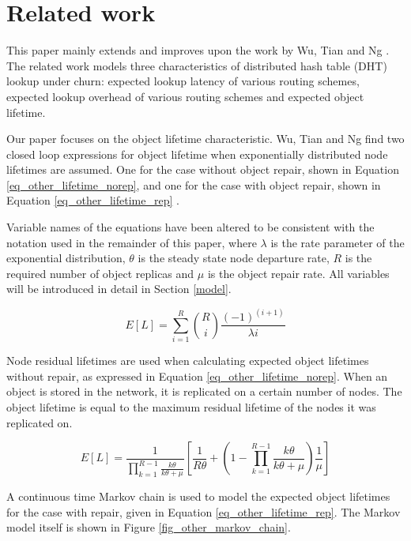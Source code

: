 \documentclass[10pt,a4paper,conference]{IEEEtran}
\begin{document}
\section{Related work}
\label{related_work}

This paper mainly extends and improves upon the work by Wu, Tian and Ng \cite{replication_article}. The related work models three characteristics of distributed hash table (DHT) lookup under churn: expected lookup latency of various routing schemes, expected lookup overhead of various routing schemes and expected object lifetime.

Our paper focuses on the object lifetime characteristic. Wu, Tian and Ng find two closed loop expressions for object lifetime when exponentially distributed node lifetimes are assumed. One for the case without object repair, shown in Equation \eqref{eq_other_lifetime_norep}, and one for the case with object repair, shown in Equation \eqref{eq_other_lifetime_rep} \cite{replication_article}.

Variable names of the equations have been altered to be consistent with the notation used in the remainder of this paper, where $\lambda$ is the rate parameter of the exponential distribution, $\theta$ is the steady state node departure rate, $R$ is the required number of object replicas and $\mu$ is the object repair rate. All variables will be introduced in detail in Section \ref{model}.

\begin{equation} \label{eq_other_lifetime_norep}
    E[L] = \sum_{i = 1}^{R}{{R}\choose{i}}\frac{(-1)^{(i+1)}}{\lambda i}
\end{equation}

Node residual lifetimes are used when calculating expected object lifetimes without repair, as expressed in Equation \eqref{eq_other_lifetime_norep}. When an object is stored in the network, it is replicated on a certain number of nodes. The object lifetime is equal to the maximum residual lifetime of the nodes it was replicated on.

\begin{equation} \label{eq_other_lifetime_rep}
    E[L] = \frac{1}{\prod_{k=1}^{R-1}\frac{k\theta}{k\theta+\mu}} \left[\frac{1}{R\theta} + \left(1 - \prod_{k=1}^{R-1}\frac{k\theta}{k\theta + \mu}\right)\frac{1}{\mu}\right]
\end{equation}

A continuous time Markov chain is used to model the expected object lifetimes for the case with repair, given in Equation \eqref{eq_other_lifetime_rep}. The Markov model itself is shown in Figure \ref{fig_other_markov_chain}.
\end{document}
